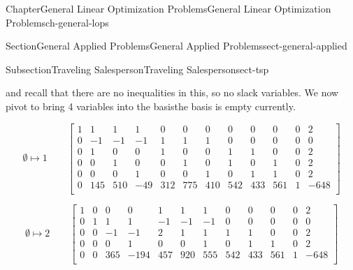 \documentclass[oneside,10pt,]{book}
\numberwithin{equation}{section}
\newcommand{\amp}{&}
\begin{document}
\begin{chapterptx}{Chapter}{General Linear Optimization Problems}{}{General Linear Optimization Problems}{}{}{ch-general-lops}
\begin{sectionptx}{Section}{General Applied Problems}{}{General Applied Problems}{}{}{sect-general-applied}
\begin{subsectionptx}{Subsection}{Traveling Salesperson}{}{Traveling Salesperson}{}{}{sect-tsp}
\begin{equation*}
\end{equation*}
%
\par
and recall that there are no inequalities in this, so no slack variables. We now pivot to bring 4 variables into the basis\textemdash{}the basis is empty currently.%
\par
%
\begin{equation*}
\emptyset \mapsto 1 \qquad \left[\begin{array}{rrrrrrrrrrr|r} 1 \amp 1 \amp 1 \amp 1 \amp 0 \amp 0 \amp 0 \amp 0 \amp 0 \amp 0 \amp 0 \amp 2\\ 0 \amp -1 \amp -1 \amp -1 \amp 1 \amp 1 \amp 1 \amp 0 \amp 0 \amp 0 \amp 0 \amp 0\\ 0 \amp 1 \amp 0 \amp 0 \amp 1 \amp 0 \amp 0 \amp 1 \amp 1 \amp 0 \amp 0 \amp 2\\ 0 \amp 0 \amp 1 \amp 0 \amp 0 \amp 1 \amp 0 \amp 1 \amp 0 \amp 1 \amp 0 \amp 2\\ 0 \amp 0 \amp 0 \amp 1 \amp 0 \amp 0 \amp 1 \amp 0 \amp 1 \amp 1 \amp 0 \amp 2\\ \hline 0 \amp 145 \amp 510 \amp -49 \amp 312 \amp 775 \amp 410 \amp 542 \amp 433 \amp 561 \amp 1 \amp -648\\ \end{array} \right]
\end{equation*}
%
\par
%
\begin{equation*}
\emptyset \mapsto 2 \qquad \left[\begin{array}{rrrrrrrrrrr|r} 1 \amp 0 \amp 0 \amp 0 \amp 1 \amp 1 \amp 1 \amp 0 \amp 0 \amp 0 \amp 0 \amp 2\\ 0 \amp 1 \amp 1 \amp 1 \amp -1 \amp -1 \amp -1 \amp 0 \amp 0 \amp 0 \amp 0 \amp 0\\ 0 \amp 0 \amp -1 \amp -1 \amp 2 \amp 1 \amp 1 \amp 1 \amp 1 \amp 0 \amp 0 \amp 2\\ 0 \amp 0 \amp 0 \amp 1 \amp 0 \amp 0 \amp 1 \amp 0 \amp 1 \amp 1 \amp 0 \amp 2\\ \hline 0 \amp 0 \amp 365 \amp -194 \amp 457 \amp 920 \amp 555 \amp 542 \amp 433 \amp 561 \amp 1 \amp -648\\ \end{array} \right]
\end{equation*}
%
\par
%
\begin{equation*}

\end{equation*}
\end{subsectionptx}
\end{sectionptx}
\end{chapterptx}
\end{document}
